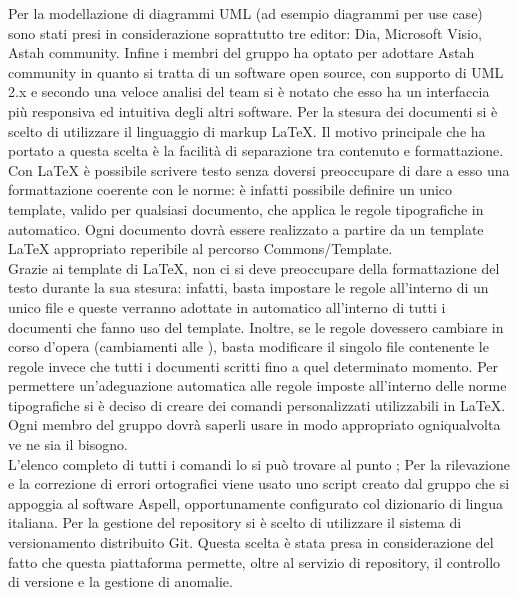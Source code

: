  \label{app:strumenti}
		Per la modellazione di diagrammi UML (ad esempio diagrammi per use case) sono stati presi in considerazione soprattutto tre editor: Dia, Microsoft Visio, Astah community. Infine i membri del gruppo \groupname{} ha optato per adottare Astah community in quanto si tratta di un software open source, con supporto di UML 2.x e secondo una veloce analisi del team si è notato che esso ha un interfaccia più responsiva ed intuitiva degli altri software.
		Per la stesura dei documenti si è scelto di utilizzare il linguaggio di markup \LaTeX{}.  Il motivo principale che ha portato a questa scelta è la facilità di separazione tra contenuto e formattazione. Con \LaTeX{} è possibile scrivere testo senza doversi preoccupare di dare a esso una formattazione coerente con le norme: è infatti possibile definire un unico template, valido per qualsiasi documento, che applica le regole tipografiche in automatico.
			Ogni documento dovrà essere realizzato a partire da un template \LaTeX{} appropriato reperibile al percorso Commons/Template.\\
			Grazie ai template di \LaTeX{}, non ci si deve preoccupare della formattazione del testo durante la sua stesura: infatti, basta impostare le regole all’interno di un unico file e queste verranno adottate in automatico all’interno di tutti i documenti che fanno uso del template. Inoltre, se le regole dovessero cambiare in corso d’opera (cambiamenti alle ), basta modificare il singolo file contenente le regole invece che tutti i documenti scritti fino a quel determinato momento.
			Per permettere un’adeguazione automatica alle regole imposte all’interno delle norme tipografiche si è deciso di creare dei comandi personalizzati utilizzabili in \LaTeX{}. Ogni membro del gruppo dovrà saperli usare in modo appropriato ogniqualvolta ve ne sia il bisogno.\\
			L’elenco completo di tutti i comandi lo si può trovare al punto ;
		Per la rilevazione e la correzione di errori ortografici viene usato uno script creato dal gruppo \groupname{} che si appoggia al software Aspell, opportunamente configurato col dizionario di lingua italiana.
	\label{sec:SceltaRepository}
		Per la gestione del repository si è scelto di utilizzare il sistema di versionamento distribuito Git. Questa scelta è stata presa in considerazione del fatto che questa piattaforma permette, oltre al servizio di repository, il controllo di versione e la gestione di anomalie. \\
